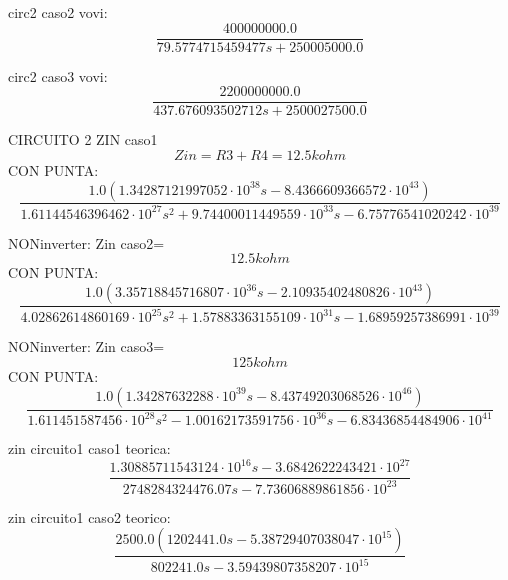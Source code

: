 circ2 caso2 vovi:
\begin{equation}
\frac{400000000.0}{79.5774715459477 s + 250005000.0}
\end{equation}

circ2 caso3 vovi:
\begin{equation}
\frac{2200000000.0}{437.676093502712 s + 2500027500.0}
\end{equation}

CIRCUITO 2
ZIN
caso1
\begin{equation}
Zin = R3 + R4 = 12.5kohm
\end{equation}
CON PUNTA:
\begin{equation}
\frac{1.0 \left(1.34287121997052 \cdot 10^{38} s - 8.4366609366572 \cdot 10^{43}\right)}{1.61144546396462 \cdot 10^{27} s^{2} + 9.74400011449559 \cdot 10^{33} s - 6.75776541020242 \cdot 10^{39}}
\end{equation}

NONinverter: Zin caso2=
\begin{equation}
12.5kohm
\end{equation}
CON PUNTA:
\begin{equation}
\frac{1.0 \left(3.35718845716807 \cdot 10^{36} s - 2.10935402480826 \cdot 10^{43}\right)}{4.02862614860169 \cdot 10^{25} s^{2} + 1.57883363155109 \cdot 10^{31} s - 1.68959257386991 \cdot 10^{39}}
\end{equation}

NONinverter: Zin caso3=
\begin{equation}
125kohm
\end{equation}
CON PUNTA:
\begin{equation}
\frac{1.0 \left(1.34287632288 \cdot 10^{39} s - 8.43749203068526 \cdot 10^{46}\right)}{1.611451587456 \cdot 10^{28} s^{2} - 1.00162173591756 \cdot 10^{36} s - 6.83436854484906 \cdot 10^{41}}
\end{equation}

zin circuito1 caso1 teorica:
\begin{equation}
\frac{1.30885711543124 \cdot 10^{16} s - 3.6842622243421 \cdot 10^{27}}{2748284324476.07 s - 7.73606889861856 \cdot 10^{23}}
\end{equation}

zin circuito1 caso2 teorico:
\begin{equation}
\frac{2500.0 \left(1202441.0 s - 5.38729407038047 \cdot 10^{15}\right)}{802241.0 s - 3.59439807358207 \cdot 10^{15}}
\end{equation}

